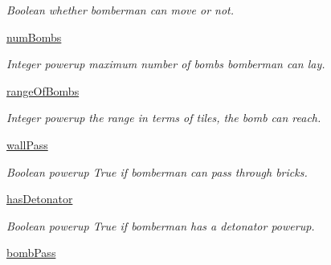 \begin{DoxyCompactItemize}
\begin{DoxyCompactList}\small\item\em Boolean whether bomberman can move or not. \end{DoxyCompactList}\item 
\hypertarget{classsrc_1_1bomberman_1_1_bomberman_a2cb3572c62ccccb8eb2383145d0d4f2e}{}\hyperlink{classsrc_1_1bomberman_1_1_bomberman_a2cb3572c62ccccb8eb2383145d0d4f2e}{num\+Bombs}\label{classsrc_1_1bomberman_1_1_bomberman_a2cb3572c62ccccb8eb2383145d0d4f2e}

\begin{DoxyCompactList}\small\item\em Integer powerup maximum number of bombs bomberman can lay. \end{DoxyCompactList}\item 
\hypertarget{classsrc_1_1bomberman_1_1_bomberman_a60e8708ab7b666aa01aeb3cf0660db92}{}\hyperlink{classsrc_1_1bomberman_1_1_bomberman_a60e8708ab7b666aa01aeb3cf0660db92}{range\+Of\+Bombs}\label{classsrc_1_1bomberman_1_1_bomberman_a60e8708ab7b666aa01aeb3cf0660db92}

\begin{DoxyCompactList}\small\item\em Integer powerup the range in terms of tiles, the bomb can reach. \end{DoxyCompactList}\item 
\hypertarget{classsrc_1_1bomberman_1_1_bomberman_a8f1c6898c8d82b94228c5d4361c389a4}{}\hyperlink{classsrc_1_1bomberman_1_1_bomberman_a8f1c6898c8d82b94228c5d4361c389a4}{wall\+Pass}\label{classsrc_1_1bomberman_1_1_bomberman_a8f1c6898c8d82b94228c5d4361c389a4}

\begin{DoxyCompactList}\small\item\em Boolean powerup True if bomberman can pass through bricks. \end{DoxyCompactList}\item 
\hypertarget{classsrc_1_1bomberman_1_1_bomberman_af3633e53e0443adbc59816892d516065}{}\hyperlink{classsrc_1_1bomberman_1_1_bomberman_af3633e53e0443adbc59816892d516065}{has\+Detonator}\label{classsrc_1_1bomberman_1_1_bomberman_af3633e53e0443adbc59816892d516065}

\begin{DoxyCompactList}\small\item\em Boolean powerup True if bomberman has a detonator powerup. \end{DoxyCompactList}\item 
\hypertarget{classsrc_1_1bomberman_1_1_bomberman_aca70e55b92691117f315e82d444188d4}{}\hyperlink{classsrc_1_1bomberman_1_1_bomberman_aca70e55b92691117f315e82d444188d4}{bomb\+Pass}\label{classsrc_1_1bomberman_1_1_bomberman_aca70e55b92691117f315e82d444188d4}


\end{DoxyCompactItemize}
